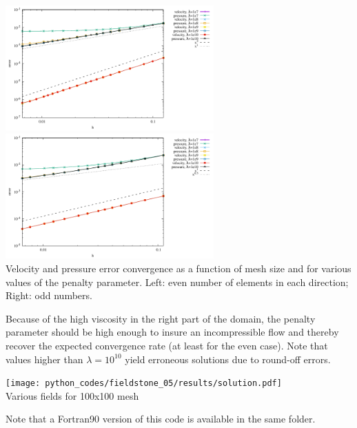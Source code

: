 \begin{center}
\includegraphics[width=8cm]{python_codes/fieldstone_05/results/errors_even.pdf}
\includegraphics[width=8cm]{python_codes/fieldstone_05/results/errors_odd.pdf}\\
{\captionfont Velocity and pressure error convergence as a function of mesh size and for various values
of the penalty parameter. Left: even number of elements in each direction; Right: odd numbers.
}
\end{center}

Because of the high viscosity in the right part of the domain, the penalty parameter should 
be high enough to insure an incompressible flow and thereby recover the expected convergence rate
(at least for the even case). Note that values higher than $\lambda=10^{10}$ yield erroneous solutions 
due to round-off errors. 

\begin{center}
\texttt{[image: python\_codes/fieldstone\_05/results/solution.pdf]}\\
{\captionfont Various fields for 100x100 mesh}
\end{center}


\infortran
Note that a Fortran90 version of this code is available in the same folder. 


